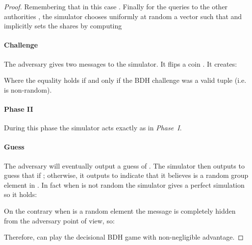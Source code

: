 \begin{proof}
      Remembering that in this case .
      Finally for the queries to the other authorities , the simulator chooses uniformly at random a vector  such that  and implicitly sets the shares  by computing
      

    \paragraph*{Challenge}
      The adversary gives two messages  to the simulator.
      It flips a coin .
      It creates:
      
      Where the equality  holds if and only if the BDH challenge was a valid tuple (i.e.  is non-random).

    \paragraph*{Phase II}
      During this phase the simulator acts exactly as in \emph{Phase~I}.

    \paragraph*{Guess}
      The adversary will eventually output a guess  of .
      The simulator then outputs  to guess that  if ; otherwise, it outputs  to indicate that it believes  is a random group element in .
      In fact when  is not random the simulator  gives a perfect simulation so it holds:
      
      On the contrary when  is a random element  the message  is completely hidden from the adversary point of view, so:
      
      Therefore,  can play the decisional BDH game with non-negligible advantage.
  \end{proof}